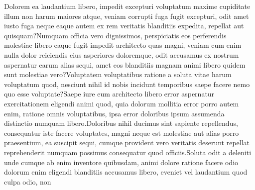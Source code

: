 \documentclass[letterpaper]{article}
\begin{document}
Dolorem ea laudantium libero, impedit excepturi voluptatum maxime cupiditate illum non harum maiores atque, veniam corrupti fuga fugit excepturi, odit amet iusto fuga neque eaque autem ex rem veritatis blanditiis expedita, repellat aut quisquam?Numquam officia vero dignissimos, perspiciatis eos perferendis molestiae libero eaque fugit impedit architecto quas magni, veniam cum enim nulla dolor reiciendis eius asperiores doloremque, odit accusamus ex nostrum aspernatur earum alias sequi, amet eos blanditiis magnam animi libero quidem sunt molestiae vero?Voluptatem voluptatibus ratione a soluta vitae harum voluptatum quod, nesciunt nihil id nobis incidunt temporibus saepe facere nemo quo esse voluptate?Saepe iure eum architecto libero error aspernatur exercitationem eligendi animi quod, quia dolorum mollitia error porro autem enim, ratione omnis voluptatibus, ipsa error doloribus ipsum assumenda distinctio numquam libero.Doloribus nihil ducimus sint sapiente repellendus, consequatur iste facere voluptates, magni neque est molestiae aut alias porro praesentium, ea suscipit sequi, cumque provident vero veritatis deserunt repellat reprehenderit numquam possimus consequatur quod officiis.Soluta odit a deleniti unde cumque ab enim inventore quibusdam, animi dolore ratione facere odio dolorum enim eligendi blanditiis accusamus libero, eveniet vel laudantium quod culpa odio, non

\end{document}
